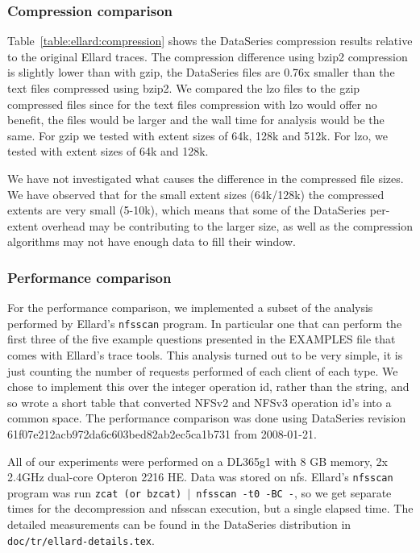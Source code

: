 \documentclass{acm_proc_article-sp}
\begin{document}
\subsubsection{Compression comparison}

Table~\ref{table:ellard:compression} shows the DataSeries compression results
relative to the original Ellard traces.  The compression difference
using bzip2 compression is slightly lower than with gzip, the
DataSeries files are 0.76x smaller than the text files compressed
using bzip2.  We compared the lzo files to the gzip compressed files
since for the text files compression with lzo would offer no benefit,
the files would be larger and the wall time for analysis would be the
same.  For gzip we tested with extent sizes of 64k, 128k and 512k.
For lzo, we tested with extent sizes of 64k and 128k.

We have not investigated what causes the difference in the compressed
file sizes.  We have observed that for the small extent sizes
(64k/128k) the compressed extents are very small (5-10k), which means
that some of the DataSeries per-extent overhead may be contributing to
the larger size, as well as the compression algorithms may not have
enough data to fill their window.

\subsubsection{Performance comparison}

For the performance comparison, we implemented a subset of the
analysis performed by Ellard's \texttt{nfsscan} program. In particular one
that can perform the first three of the five example questions
presented in the EXAMPLES file that comes with Ellard's trace tools.
This analysis turned out to be very simple, it is just counting the
number of requests performed of each client of each type.  We chose to
implement this over the integer operation id, rather than the string,
and so wrote a short table that converted NFSv2 and NFSv3 operation
id's into a common space. The performance comparison was done using
DataSeries revision 61f07e212acb972da6c603bed82ab2ec5ca1b731 from
2008-01-21.

All of our experiments were performed on a DL365g1 with 8 GB memory,
2x 2.4GHz dual-core Opteron 2216 HE.  Data was stored on nfs.
Ellard's \texttt{nfsscan} program was run \texttt{zcat (or bzcat) $|$
nfsscan -t0 -BC -}, so we get separate times for the decompression and
nfsscan execution, but a single elapsed time.  The detailed
measurements can be found in the DataSeries distribution in
\texttt{doc/tr/ellard-details.tex}.
\end{document}
